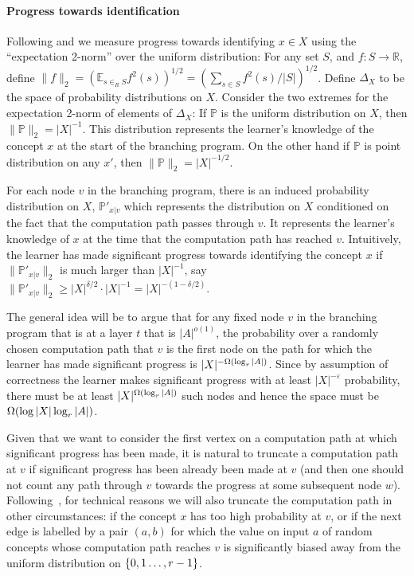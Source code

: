 \paragraph{Progress towards identification}

Following \cite{DBLP:conf/colt/MoshkovitzM17} and \cite{DBLP:conf/focs/Raz17}
we measure progress towards identifying $x\in X$ using
the ``expectation 2-norm'' over the uniform distribution:
For any set $S$, and $f:S\rightarrow \mathbb{R}$, define 
$\|f\|_2=\left(\mathbb{E}_{s\in_R S} f^2(s)\right)^{1/2}=(\sum_{s\in S} f^2(s)/|S|)^{1/2}$.
Define $\Delta_X$ to be the space of probability distributions on $X$.
Consider the two extremes for the expectation 2-norm of elements of $\Delta_X$:
If $\mathbb{P}$ is the uniform distribution on $X$,
then $\|\mathbb{P}\|_2 = |X|^{-1}$.  This distribution represents the learner's knowledge
of the concept $x$ at the start of the branching program.
On the other hand if $\mathbb{P}$ is point distribution on any $x'$, then
$\|\mathbb{P}\|_2=|X|^{-1/2}$.

For each node $v$ in the branching program, there is an induced probability
distribution on $X$, $\mathbb{P}'_{x|v}$ which represents the distribution on
$X$ conditioned on the fact that the computation path passes through $v$.  
It represents the learner's knowledge of $x$ at the time that the computation
path has reached $v$.
Intuitively, the learner has made significant progress towards identifying the
concept $x$ if $\|\mathbb{P}'_{x|v}\|_2$ is much larger than $|X|^{-1}$, say
$\|\mathbb{P}'_{x|v}\|_2\ge |X|^{\delta/2}\cdot |X|^{-1}=|X|^{-(1-\delta/2)}$.

The general idea will be to argue that for any fixed node $v$ in the branching
program that is at a layer $t$ that is $|A|^{o(1)}$,
the probability over a randomly chosen computation path that $v$ is the first
node on the path for which the learner has made significant progress is
$|X|^{-\Omega(\log_r |A|)}$.  Since by assumption of correctness the learner makes
significant progress with at least $|X|^{-\varepsilon}$ probability, there
must be at least $|X|^{\Omega(\log_r |A|)}$
such nodes and hence the space must be $\Omega(\log|X|\log_r |A|)$.

Given that we want to consider the first vertex on a computation path at which
significant progress has been made, it is natural to truncate a computation
path at $v$ if significant progress has been already been made at $v$ (and then
one should not count any path through $v$ towards the progress at some
subsequent node $w$).  Following~\cite{DBLP:conf/focs/Raz17}, for
technical reasons we will also
truncate the computation path in other circumstances: if the concept $x$ has 
too high probability at $v$, or if the next edge is labelled by a pair $(a,b)$ 
for which the value on input $a$ of random concepts whose computation path reaches
$v$ is significantly biased away from the uniform distribution on
$\{0,1\ldots,r-1\}$.

